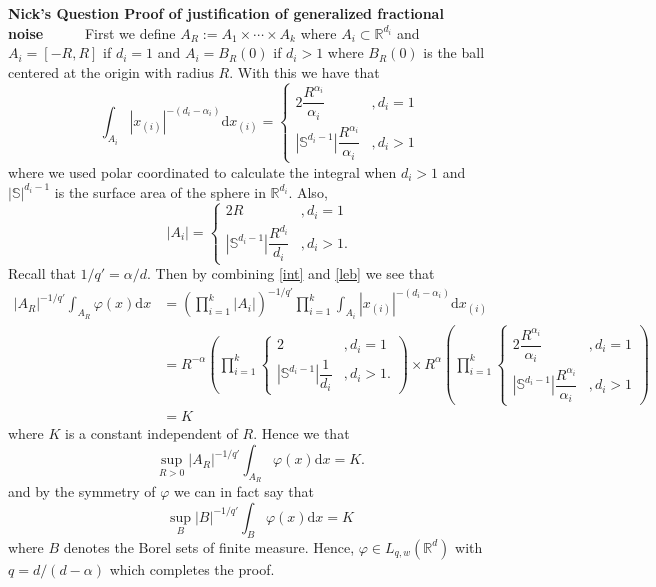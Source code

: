 \documentclass[a4paper,11pt]{article}
\numberwithin{equation}{section}
\theoremstyle{plain}
\theoremstyle{definition}
\newcommand{\ud}{\ensuremath{\mathrm{d} }}
\newcommand{\R}{\mathbb{R}}
\newcounter{NQ}
\newenvironment{NickQuestion}[1][] %
{\refstepcounter{NQ}
	\begin{mdframed}[backgroundcolor=lightgray]\textbf{Nick's Question \theNQ \: #1~~}~~~\noindent}%
	{\end{mdframed}}
\numberwithin{NQ}{section}
\numberwithin{LQ}{section}
\numberwithin{ZQ}{section}
\begin{document}
\begin{NickQuestion}[Proof of justification of generalized fractional noise]
		First we define $A_R := A_1 \times \cdots \times A_k$ where $A_i \subset \R^{d_i}$ and $A_i = [-R,R]$ if $d_i = 1$ and $A_i = B_R(0)$ if $d_i > 1$ where $B_R(0)$ is the ball centered at the origin with radius $R$. With this we have that
		\begin{equation}\label{int} \int_{A_i} |x_{(i)}|^{-(d_i-\alpha_i)} \ud x_{(i)} =
		\begin{cases}
		2 \dfrac{R^{\alpha_i}}{\alpha_i} & , d_i =1
		\\ |\mathbb{S}^{d_i - 1}|\dfrac{R^{\alpha_i}}{\alpha_i} & , d_i >1
		\end{cases}
		\end{equation}
where we used polar coordinated to calculate the integral when $d_i > 1$ and $|\mathbb{S}|^{d_i-1}$ is the surface area of the sphere in $\R^{d_i}$. Also,
		\begin{equation}\label{leb} |A_i|  =
		\begin{cases}
		2 R& , d_i =1
		\\ |\mathbb{S}^{d_i - 1}|\dfrac{R^{d_i}}{d_i} & , d_i >1.
		\end{cases}
		\end{equation}
		Recall that $1/q' = \alpha/d$. Then by combining \ref{int} and \ref{leb} we see that
		\begin{align*}
		|A_R|^{-1/q'}	\int_{A_R} \varphi(x) \ud x &= \left(\prod_{i =1}^k |A_i|\right)^{-1/q'} \prod_{i=1}^k \int_{A_i} |x_{(i)}|^{-(d_i-\alpha_i)} \ud x_{(i)}
		\\&= R^{-\alpha} \left( \prod_{i =1}^k\begin{cases}
		2 & , d_i =1
		\\ |\mathbb{S}^{d_i - 1}|\dfrac{1}{d_i} & , d_i >1.
		\end{cases} \right) \times R^\alpha 	\left(\prod_{i =1}^k \begin{cases}
		2 \dfrac{R^{\alpha_i}}{\alpha_i} & , d_i =1
		\\ |\mathbb{S}^{d_i - 1}|\dfrac{R^{\alpha_i}}{\alpha_i} & , d_i >1
		\end{cases} \right)
		\\&= K
		\end{align*}
		where $K$ is a constant independent of $R$. Hence we that
		\[
		\sup_{R>0} 	|A_R|^{-1/q'}	\int_{A_R} \varphi(x) \ud x = K.
		\]
		and by the symmetry of $\varphi$ we can in fact say that
		\[
		\sup_{B} 	|B|^{-1/q'}	\int_{B} \varphi(x) \ud x = K
		\]
		where $B$ denotes the Borel sets of finite measure. Hence, $\varphi \in L_{q,w}(\R^d)$ with $q = d/(d-\alpha)$ which completes the proof.
	\end{NickQuestion}
\end{document}
